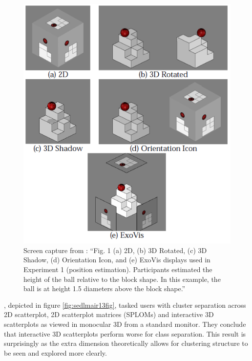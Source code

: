 \documentclass{monashthesis}
\begin{document}
\begin{figure}

{\centering \includegraphics[width=0.5\linewidth]{./figures/tory06fig} 

}

\caption{Screen capture from
\textcite{tory_visualization_2006}: ``Fig. 1 (a) 2D, (b) 3D Rotated, (c)
3D Shadow, (d) Orientation Icon, and (e) ExoVis displays used in
Experiment 1 (position estimation). Participants estimated the height of
the ball relative to the block shape. In this example, the ball is at
height 1.5 diameters above the block shape.''}\label{fig:tory06fig}
\end{figure}

\textcite{sedlmair_empirical_2013}, depicted in figure
\ref{fig:sedlmair13fig}, tasked users with cluster separation across 2D
scatterplot, 2D scatterplot matrices (SPLOMs) and interactive 3D
scatterplots as viewed in monocular 3D from a standard monitor. They
conclude that interactive 3D scatterplots perform worse for class
separation. This result is surprisingly as the extra dimension
theoretically allows for clustering structure to be seen and explored
more clearly.
\end{document}
